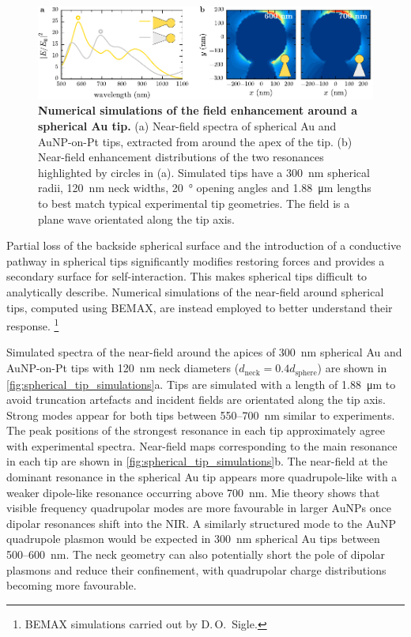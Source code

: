 \documentclass{article}
\begin{document}
\begin{figure}[bt]
\centering
\includegraphics{figures/spherical_tip_simulations}
\caption[Numerical simulations of the field enhancement around a spherical Au tip]{\textbf{Numerical simulations of the field enhancement around a spherical Au tip.} (a) Near-field spectra of spherical Au and AuNP-on-Pt tips, extracted from around the apex of the tip. (b) Near-field enhancement distributions of the two resonances highlighted by circles in (a). Simulated tips have a \SI{300}{nm} spherical radii, \SI{120}{nm} neck widths, \SI{20}{\degree} opening angles and \SI{1.88}{\micro\metre} lengths to best match typical experimental tip geometries. The field is a plane wave orientated along the tip axis.}
\label{fig:spherical_tip_simulations}
\end{figure}

Partial loss of the backside spherical surface and the introduction of a conductive pathway in spherical tips significantly modifies restoring forces and provides a secondary surface for self-interaction. This makes spherical tips difficult to analytically describe. Numerical simulations of the near-field around spherical tips, computed using BEMAX, are instead employed to better understand their response.%
\footnote{BEMAX simulations carried out by D.\,O.\ Sigle.}

Simulated spectra of the near-field around the apices of \SI{300}{nm} spherical Au and AuNP-on-Pt tips with \SI{120}{nm} neck diameters ($d_{\mathrm{neck}}=0.4d_{\mathrm{sphere}}$) are shown in \autoref{fig:spherical_tip_simulations}a. Tips are simulated with a length of \SI{1.88}{\micro\metre} to avoid truncation artefacts and incident fields are orientated along the tip axis. Strong modes appear for both tips between 550--\SI{700}{nm} similar to experiments. The peak positions of the strongest resonance in each tip approximately agree with experimental spectra. Near-field maps corresponding to the main resonance in each tip are shown in \autoref{fig:spherical_tip_simulations}b. The near-field at the dominant resonance in the spherical Au tip appears more quadrupole-like with a weaker dipole-like resonance occurring above \SI{700}{nm}.
Mie theory shows that visible frequency quadrupolar modes are more favourable in larger AuNPs once dipolar resonances shift into the NIR. A similarly structured mode to the AuNP quadrupole plasmon would be expected in \SI{300}{nm} spherical Au tips between 500--\SI{600}{nm}. The neck geometry can also potentially short the pole of dipolar plasmons and reduce their confinement, with quadrupolar charge distributions becoming more favourable.
\end{document}
